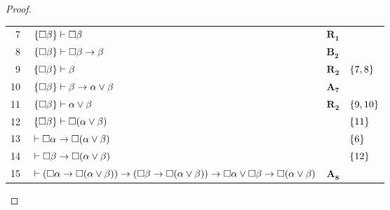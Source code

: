 \begin{tcolorbox}[enhanced jigsaw, breakable, sharp corners, colframe=black, colback=white, boxrule=0.5pt, left=1.5mm, right=1.5mm, top=1.5mm, bottom=1.5mm]
\begin{lemma}
\begin{proof}
\begin{xltabular}{\textwidth}{r | X l l}
            \scriptsize{\phantom{0}7}\phantom{ } & $\ \set{\nec\beta}\vdash\nec\beta$                                                                                                     & $\hyperref[modal.rule.1]{\mathbf{R_1}}$        & \\[\rowskip]
            \scriptsize{\phantom{0}8}\phantom{ } & $\ \set{\nec\beta}\vdash\nec\beta \to \beta$                                                                                           & $\hyperref[modal.axiom.modal.2]{\mathbf{B_2}}$ & \\[\rowskip]
            \scriptsize{\phantom{0}9}\phantom{ } & $\ \set{\nec\beta}\vdash\beta$                                                                                                         & $\hyperref[modal.rule.2]{\mathbf{R_2}}$        & $\left\{7,8\right\}$\\[\rowskip]
            \scriptsize{10}\phantom{ }           & $\ \set{\nec\beta}\vdash\beta\to\alpha\vee\beta$                                                                                       & $\hyperref[modal.axiom.7]{\mathbf{A_7}}$       & \\[\rowskip]
            \scriptsize{11}\phantom{ }           & $\ \set{\nec\beta}\vdash\alpha\vee\beta$                                                                                               & $\hyperref[modal.rule.2]{\mathbf{R_2}}$        & $\left\{9,10\right\}$\\[\rowskip]
            \scriptsize{12}\phantom{ }           & $\ \set{\nec\beta}\vdash\nec(\alpha\vee\beta)$                                                                                         &                       & $\left\{11\right\}$\\[\rowskip]
            \scriptsize{13}\phantom{ }           & $\ \vdash\nec\alpha\to\nec(\alpha\vee\beta)$                                                                                           &                            & $\left\{6\right\}$\\[\rowskip]
            \scriptsize{14}\phantom{ }           & $\ \vdash\nec\beta\to\nec(\alpha\vee\beta)$                                                                                            &                            & $\left\{12\right\}$\\[\rowskip]
            \scriptsize{15}\phantom{ }           & $\ \vdash(\nec\alpha\to\nec(\alpha\vee\beta))\to(\nec\beta\to\nec(\alpha\vee\beta))\to\nec\alpha\vee\nec\beta\to\nec(\alpha\vee\beta)$ & $\hyperref[modal.axiom.8]{\mathbf{A_8}}$       & \\[\rowskip]

\end{xltabular}
\end{proof}
\end{lemma}
\end{tcolorbox}
